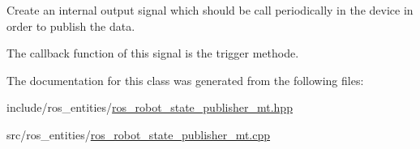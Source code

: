 Create an internal output signal which should be call periodically in the device in order to publish the data. 

The callback function of this signal is the trigger methode. 

The documentation for this class was generated from the following files\+:\begin{DoxyCompactItemize}
\item 
include/ros\+\_\+entities/\hyperlink{ros__robot__state__publisher__mt_8hpp}{ros\+\_\+robot\+\_\+state\+\_\+publisher\+\_\+mt.\+hpp}\item 
src/ros\+\_\+entities/\hyperlink{ros__robot__state__publisher__mt_8cpp}{ros\+\_\+robot\+\_\+state\+\_\+publisher\+\_\+mt.\+cpp}\end{DoxyCompactItemize}
